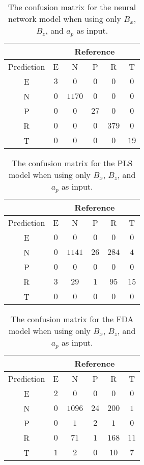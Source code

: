\begin{table}[!ht]
	\centering
	\begin{tabular}{|c|c|c|c|c|c|}
		\hline
		 & \multicolumn{5}{|c|}{Reference} \\ \hline
		 Prediction & E & N & P & R & T \\ \hline
		 E & $3$ & $0$ & $0$ & $0$ & $0$ \\ \hline
		 N & $0$ & $1170$ & $0$ & $0$ & $0$ \\ \hline
		 P & $0$ & $0$ & $27$ & $0$ & $0$ \\ \hline
		 R & $0$ & $0$ & $0$ & $379$ & $0$ \\ \hline
		 T & $0$ & $0$ & $0$ & $0$ & $19$ \\ \hline
	\end{tabular}
	\caption{The confusion matrix for the neural network model when using only $B_{x}$, $B_{z}$, and $a_{p}$ as input.}
	\label{tab:cm:xzap:nnet}
\end{table}

\begin{table}[!ht]
	\centering
	\begin{tabular}{|c|c|c|c|c|c|}
		\hline
		 & \multicolumn{5}{|c|}{Reference} \\ \hline
		 Prediction & E & N & P & R & T \\ \hline
		 E & $0$ & $0$ & $0$ & $0$ & $0$ \\ \hline
		 N & $0$ & $1141$ & $26$ & $284$ & $4$ \\ \hline
		 P & $0$ & $0$ & $0$ & $0$ & $0$ \\ \hline
		 R & $3$ & $29$ & $1$ & $95$ & $15$ \\ \hline
		 T & $0$ & $0$ & $0$ & $0$ & $0$ \\ \hline
	\end{tabular}
	\caption{The confusion matrix for the PLS model when using only $B_{x}$, $B_{z}$, and $a_{p}$ as input.}
	\label{tab:cm:xzap:pls}
\end{table}

\begin{table}[!ht]
	\centering
	\begin{tabular}{|c|c|c|c|c|c|}
		\hline
		 & \multicolumn{5}{|c|}{Reference} \\ \hline
		 Prediction & E & N & P & R & T \\ \hline
		 E & $2$ & $0$ & $0$ & $0$ & $0$ \\ \hline
		 N & $0$ & $1096$ & $24$ & $200$ & $1$ \\ \hline
		 P & $0$ & $1$ & $2$ & $1$ & $0$ \\ \hline
		 R & $0$ & $71$ & $1$ & $168$ & $11$ \\ \hline
		 T & $1$ & $2$ & $0$ & $10$ & $7$ \\ \hline
	\end{tabular}
	\caption{The confusion matrix for the FDA model when using only $B_{x}$, $B_{z}$, and $a_{p}$ as input.}
	\label{tab:cm:xzap:fda}
\end{table}

